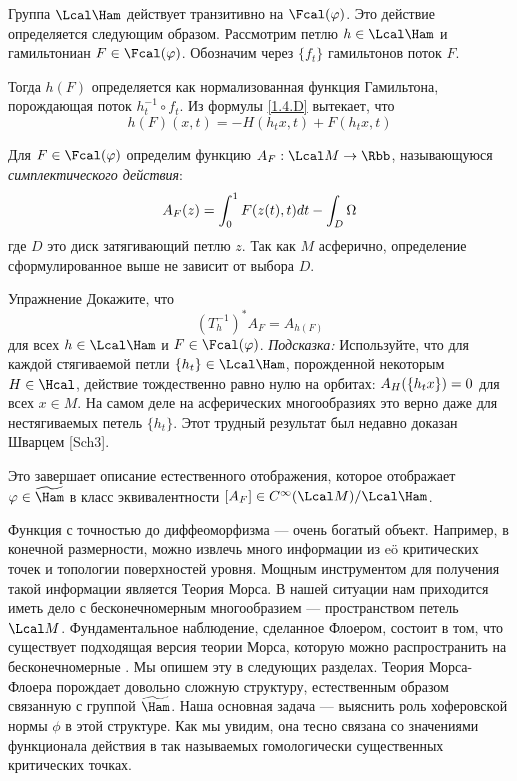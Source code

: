 Группа $\Lcal\Ham$ действует транзитивно на $\Fcal(\phi)$. Это
действие определяется следующим образом. Рассмотрим петлю $h\in\Lcal\Ham$ и
гамильтониан $F\in\Fcal(\phi)$. Обозначим через $\{f_{t}\}$
гамильтонов поток $F$.

Тогда $h(F)$ определяется как нормализованная функция Гамильтона, порождающая поток
$h^{-1}_{t}\circ f_{t}$. Из формулы \ref{1.4.D} вытекает, что
\[
h(F)(x,t) = -H(h_{t}x,t) + F(h_{t}x,t)
\]

Для $F\in\Fcal(\phi)$ определим функцию $A_{F}:\Lcal M\to\Rbb$,
называющуюся {\em {} симплектического действия}:
\[
A_{F}(z)=\int_{0}^{1}F(z(t),t)d t - \int_{D}\Omega
\]
где $D$ это диск затягивающий петлю $z$. Так как $M$ асферично,
определение сформулированное выше не зависит от выбора $D$.

\begin{ex}{Упражнение}\label{13.1.A}
  Докажите, что
  \[
  (T_{h}^{-1})^{*}A_{F}= A _{h(F)}
  \]
  для всех $h\in\Lcal\Ham$ и $F\in\Fcal(\phi)$. {\em Подсказка:}
  Используйте, что для каждой стягиваемой петли
  $\{h_{t}\}\in\Lcal\Ham$, порожденной некоторым $H\in\Hcal$, действие
  тождественно равно нулю на орбитах: $A_{H}(\{h_{t}x\}) \z= 0$ для всех
  $x\in M$.
  На самом деле на асферических многообразиях это верно даже для
  нестягиваемых петель $\{h_{t}\}$.
  Этот трудный результат был недавно доказан Шварцем [Sch3].
\end{ex}
Это завершает описание естественного отображения, которое отображает
$\phi\in\widetilde\Ham$ в
класс эквивалентности $[A_{F}]\in C^{\infty} (\Lcal M)/\Lcal\Ham$.

Функция с точностью до диффеоморфизма — очень богатый объект. Например, в
конечной размерности, можно извлечь много информации из eö критических
точек  и топологии поверхностей уровня.
Мощным инструментом для получения такой информации является
Теория Морса. В нашей ситуации нам приходится иметь дело с бесконечномерным
многообразием --- пространством петель $\Lcal M$.
Фундаментальное наблюдение, сделанное Флоером, состоит в том,
что существует подходящая версия теории Морса, которую можно распространить на
бесконечномерные .
Мы опишем эту  в следующих разделах. Теория
Морса-Флоера порождает довольно сложную структуру, естественным образом связанную 
с группой $\widetilde\Ham$. Наша основная задача --- выяснить роль
хоферовской нормы $\phi$ в этой структуре.
Как мы увидим, она тесно связана со значениями функционала действия
в так называемых гомологически существенных критических точках. 

